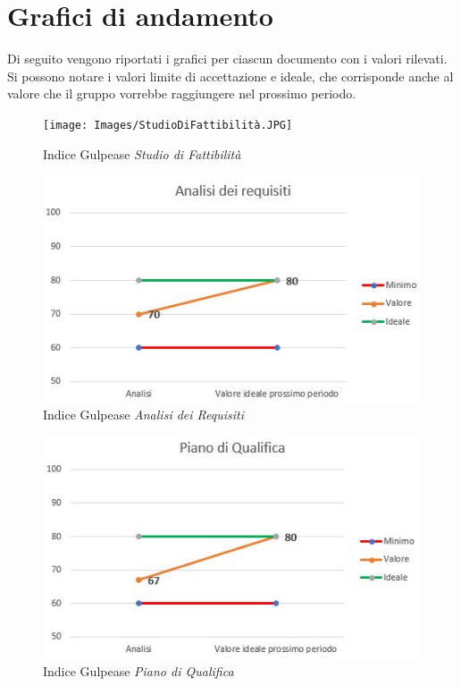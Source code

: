 \section{Grafici di andamento}
Di seguito vengono riportati i grafici per ciascun documento con i valori rilevati. Si possono notare i valori limite di accettazione e ideale, che corrisponde anche al valore che il gruppo vorrebbe raggiungere nel prossimo periodo.

\begin{figure}[h]
	\centering
	\texttt{[image: Images/StudioDiFattibilità.JPG]}
	\caption{Indice Gulpease \textit{Studio di Fattibilità}}
\end{figure}

\begin{figure}
	\centering
	\includegraphics[scale=1]{Images/AnalisiDeiRequisiti.JPG}
	\caption{Indice Gulpease \textit{Analisi dei Requisiti}}
\end{figure}

\begin{figure}
	\centering
	\includegraphics[scale=1]{Images/PianoDiQualifica.JPG}
	\caption{Indice Gulpease \textit{Piano di Qualifica}}
\end{figure}

